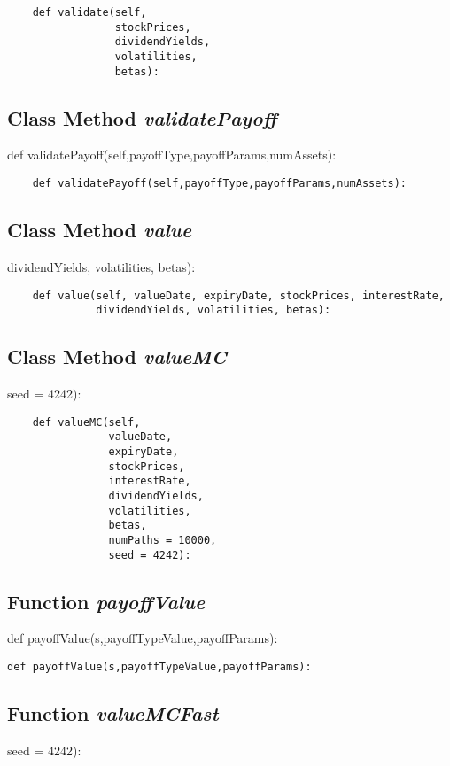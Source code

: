 \documentclass[twoside,11pt]{book}
\begin{document}
\begin{lstlisting}
    def validate(self, 
                 stockPrices,
                 dividendYields,
                 volatilities, 
                 betas):
\end{lstlisting}

\subsection{Class Method {\it validatePayoff}}
def validatePayoff(self,payoffType,payoffParams,numAssets):

\begin{lstlisting}
    def validatePayoff(self,payoffType,payoffParams,numAssets):
\end{lstlisting}

\subsection{Class Method {\it value}}
dividendYields, volatilities, betas):

\begin{lstlisting}
    def value(self, valueDate, expiryDate, stockPrices, interestRate,
              dividendYields, volatilities, betas):
\end{lstlisting}

\subsection{Class Method {\it valueMC}}
seed = 4242):

\begin{lstlisting}
    def valueMC(self, 
                valueDate,
                expiryDate,
                stockPrices,
                interestRate,
                dividendYields,
                volatilities,
                betas,
                numPaths = 10000,
                seed = 4242):
\end{lstlisting}

\subsection{Function {\it payoffValue}}
def payoffValue(s,payoffTypeValue,payoffParams):

\begin{lstlisting}
def payoffValue(s,payoffTypeValue,payoffParams):
\end{lstlisting}

\subsection{Function {\it valueMCFast}}
seed = 4242):
\end{document}
